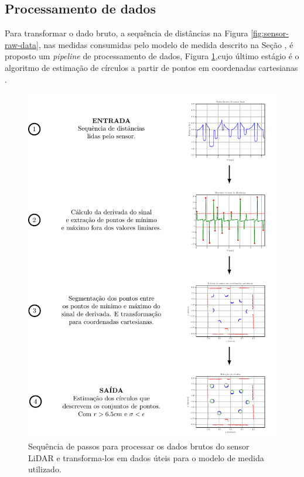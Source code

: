 \subsection{Processamento de dados}
Para transformar o dado bruto, a sequência de distâncias na Figura 
\ref{fig:sensor-raw-data}, nas medidas consumidas pelo modelo de medida 
descrito na Seção \emph{}, é proposto um 
\textit{pipeline} de processamento de dados, Figura \ref{fig:lidar-data-processing-pipeline},cujo último estágio é o 
algoritmo de estimação de círculos a partir de pontos em coordenadas 
cartesianas \cite[p.~903]{al2009error}.

\begin{figure}[]
  \includegraphics[width=\textwidth]{figs/data_processing_pipeline.pdf}
  \caption{Sequência de passos para processar os dados brutos do sensor LiDAR e
  transforma-los em dados úteis para o modelo de medida utilizado.}
  \label{fig:lidar-data-processing-pipeline}
\end{figure}

